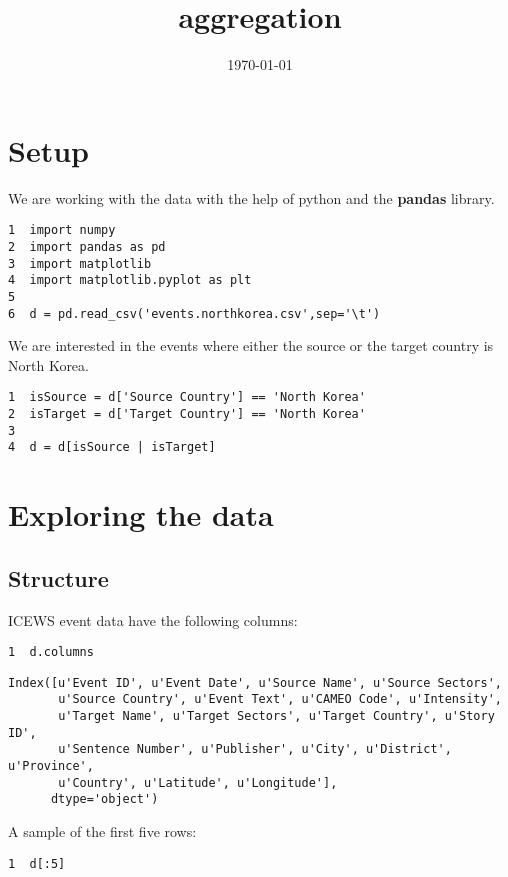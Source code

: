 \documentclass[11pt]{article}
\date{\today}
\title{aggregation}
\begin{document}
\maketitle
\tableofcontents

\section{Setup}
\label{sec-1}
We are working with the data with the help of python and the \textbf{pandas} library.

\begin{verbatim}
1  import numpy
2  import pandas as pd
3  import matplotlib
4  import matplotlib.pyplot as plt
5  
6  d = pd.read_csv('events.northkorea.csv',sep='\t')
\end{verbatim}

We are interested in the events where either the source or the target country is North Korea.

\begin{verbatim}
1  isSource = d['Source Country'] == 'North Korea'
2  isTarget = d['Target Country'] == 'North Korea'
3  
4  d = d[isSource | isTarget]
\end{verbatim}

\section{Exploring the data}
\label{sec-2}
\subsection{Structure}
\label{sec-2-1}
ICEWS event data have the following columns:

\begin{verbatim}
1  d.columns
\end{verbatim}

\begin{verbatim}
Index([u'Event ID', u'Event Date', u'Source Name', u'Source Sectors',
       u'Source Country', u'Event Text', u'CAMEO Code', u'Intensity',
       u'Target Name', u'Target Sectors', u'Target Country', u'Story ID',
       u'Sentence Number', u'Publisher', u'City', u'District', u'Province',
       u'Country', u'Latitude', u'Longitude'],
      dtype='object')
\end{verbatim}

A sample of the first five rows:
\begin{verbatim}
1  d[:5]
\end{verbatim}
\end{document}
